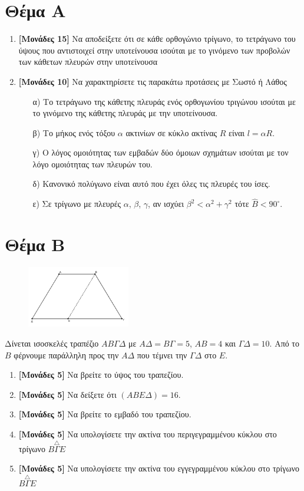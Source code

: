 \documentclass[12pt]{article}
\begin{document}
\section*{Θέμα Α}
\noindent
\begin{enumerate}
    \item \textbf{[Μονάδες 15]} Να αποδείξετε ότι σε κάθε ορθογώνιο τρίγωνο, το τετράγωνο του ύψους που αντιστοιχεί στην υποτείνουσα ισούται με το γινόμενο των προβολών των κάθετων πλευρών στην υποτείνουσα
    \item \textbf{[Μονάδες 10]}  Να χαρακτηρίσετε τις παρακάτω προτάσεις με Σωστό ή Λάθος
          \begin{enumerate}
              \item [α)] Το τετράγωνο της κάθετης πλευράς ενός ορθογωνίου τριγώνου ισούται με το γινόμενο της κάθετης πλευράς με την υποτείνουσα.
              \item [β)] Το μήκος ενός τόξου $α$ ακτινίων σε κύκλο ακτίνας $R$ είναι $l=αR$.
              \item [γ)] Ο λόγος ομοιότητας των εμβαδών δύο όμοιων σχημάτων ισούται με τον λόγο ομοιότητας των πλευρών του.
              \item [δ)] Κανονικό πολύγωνο είναι αυτό που έχει όλες τις πλευρές του ίσες.
              \item [ε)] Σε τρίγωνο με πλευρές $α$, $β$, $γ$, αν ισχύει $β^2<α^2+γ^2$ τότε $\hat{Β}<90^{\circ}$.
          \end{enumerate}
\end{enumerate}

\section*{Θέμα Β}
\noindent
\begin{figure}
    \centering
    \vspace{-20pt}
    \includegraphics[width=0.4\textwidth]{2017BGeo2}
\end{figure}
Δίνεται ισοσκελές τραπέζιο $ΑΒΓΔ$ με $ΑΔ=ΒΓ=5$, $ΑΒ=4$ και $ΓΔ=10$. Από το $Β$ φέρνουμε παράλληλη προς την $ΑΔ$ που τέμνει την $ΓΔ$ στο $Ε$.
\begin{enumerate}
    \item \textbf{[Μονάδες 5]}  Να βρείτε το ύψος του τραπεζίου.
    \item \textbf{[Μονάδες 5]}  Να δείξετε ότι $(ΑΒΕΔ)=16$.
    \item \textbf{[Μονάδες 5]}  Να βρείτε το εμβαδό του τραπεζίου.
    \item \textbf{[Μονάδες 5]}  Να υπολογίσετε την ακτίνα του περιγεγραμμένου κύκλου στο τρίγωνο $\overset{\triangle}{ΒΓΕ}$
    \item \textbf{[Μονάδες 5]}  Να υπολογίσετε την ακτίνα του εγγεγραμμένου κύκλου στο τρίγωνο $\overset{\triangle}{ΒΓΕ}$
\end{enumerate}
\end{document}
